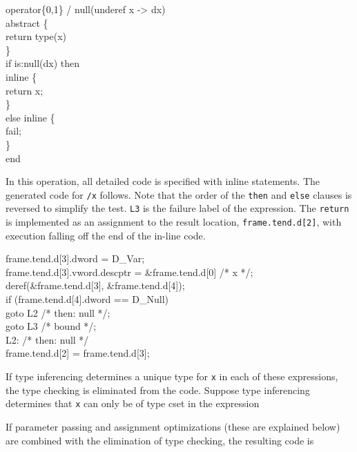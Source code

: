 \goodbreak
\begin{iconcode}
operator\{0,1\} / null(underef x -> dx)\\
\>abstract \{\\
\>\>return type(x)\\
\>\>\}\\
\>if is:null(dx) then\\
\>\>inline \{\\
\>\>\>return x;\\
\>\>\>\}\\
\>else inline \{\\
\>\>fail;\\
\>\>\}\\
end\\
\end{iconcode}

\noindent
In this operation, all detailed code is specified with inline
statements. The generated code for \texttt{/x} follows. Note that the
order of the \texttt{then} and \texttt{else} clauses is reversed to
simplify the test. \texttt{L3} is the failure label of the expression.
The \texttt{return} is implemented as an assignment to the result
location, \texttt{frame.tend.d[2]}, with execution falling off the end
of the in-line code.

\goodbreak
\begin{iconcode}
\>\>frame.tend.d[3].dword = D\_Var;\\
\>\>frame.tend.d[3].vword.descptr = \&frame.tend.d[0] /* x */;\\
\>\>deref(\&frame.tend.d[3], \&frame.tend.d[4]);\\
\>\>if (frame.tend.d[4].dword == D\_Null)\\
\>\>\>goto L2 /* then: null */;\\
\>\>goto L3 /* bound */;\\
\>L2: /* then: null */\\
\>\>frame.tend.d[2] = frame.tend.d[3];\\
\end{iconcode}


If type inferencing determines a unique type for \texttt{x} in each of
these expressions, the type checking is eliminated from the code.
Suppose type inferencing determines that \texttt{x} can only be of type
cset in the expression


\noindent
If parameter passing and assignment optimizations (these are explained
below) are combined with the elimination of type checking, the
resulting code is


